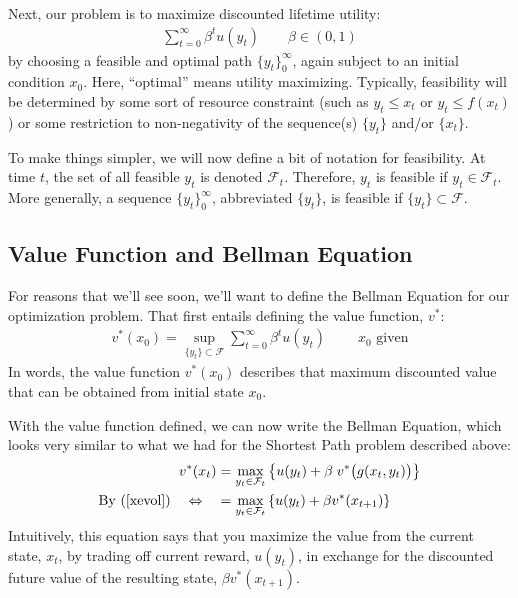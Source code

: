 \documentclass[a4paper,12pt]{scrartcl}
\begin{document}
Next, our problem is to maximize discounted lifetime utility: 
\begin{align}
  \label{toughproblem}
  \sum^\infty_{t=0} \beta^t u(y_t)
  \qquad \beta\in (0,1)
\end{align}
by choosing a feasible and optimal path $\{ y_t \}_0^\infty$, again
subject to an initial condition $x_0$.  Here,
``optimal'' means utility maximizing. Typically, feasibility
will be determined by some sort of resource constraint
(such as $y_t\leq x_t$ or $y_t\leq f(x_t)$) or some
restriction to non-negativity of the sequence(s) $\{ y_t
\}$ and/or $\{x_t\}$. 

To make things simpler, we will now define a bit of
notation for feasibility. At time $t$, the set of all
feasible $y_t$ is denoted $\mathcal{F}_t$. Therefore, $y_t$
is feasible if $y_t\in \mathcal{F}_t$. More generally, a
sequence $\{y_t\}^\infty_0$, abbreviated $\{y_t\}$, is
feasible if $\{y_t\} \subset \mathcal{F}$.


\subsection{Value Function and Bellman Equation}

For reasons that we'll see soon, we'll want to define the
Bellman Equation for our optimization problem. That first
entails defining the value function, $v^*$: 
\begin{align*}
  v^*(x_0) = \sup_{ \{y_t\} \subset \mathcal{F}}
  \sum^\infty_{t=0} \beta^t u(y_t)\; 
  \qquad
  \text{$x_0$ given}
\end{align*}
In words, the value function $v^*(x_0)$ describes that
maximum discounted value that can be obtained from initial
state $x_0$.

With the value function defined, we can now write the
Bellman Equation, which looks very similar to what we had
for the Shortest Path problem described above:
\begin{align}
  v^*(x_t) &= \max_{y_t \in \mathcal{F}_t} 
  \left\{ u(y_t) + \beta \; v^*\big(g(x_t, y_t)\big) \right\} \\
    \text{By (\ref{xevol})} \quad \Leftrightarrow \quad 
  &= \max_{y_t \in \mathcal{F}_t} 
    \left\{ u(y_t) + \beta v^*(x_{t+1}) \right\} \notag
\end{align}
Intuitively, this equation says that you maximize the value from the
current state, $x_t$, by trading off current reward, $u(y_t)$, in
exchange for the discounted future value of the resulting state,
$\beta v^*(x_{t+1})$.
\end{document}
